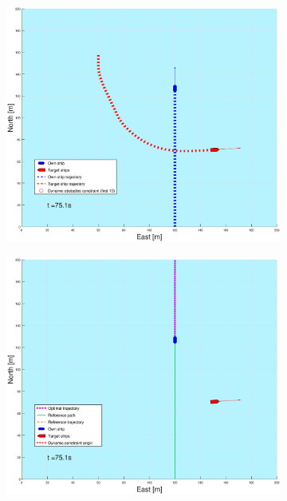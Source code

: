 \begin{figure}[ht]\ContinuedFloat
    \begin{subfigure}[b]{0.49\textwidth}
        \centering
        \includegraphics[width=\textwidth]{Images/Figures/sving_SO/_Simple_1fig1_time=75}
    \end{subfigure}
    \hfill
    \begin{subfigure}[b]{0.499\textwidth}
        \centering
        \includegraphics[width=\textwidth]{Images/Figures/sving_SO/_Simple_1fig999_time=75}

\end{subfigure}
\end{figure}
